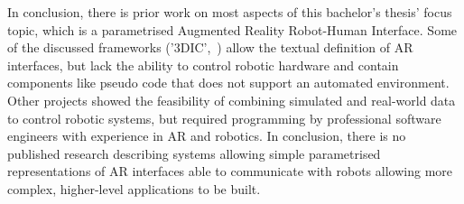 In conclusion, there is prior work on most aspects of this bachelor’s thesis’ focus topic, which is a parametrised Augmented Reality Robot-Human Interface. Some of the discussed frameworks ('3DIC',~\cite{figueroa2006conceptual}) allow the textual definition of AR interfaces, but lack the ability to control robotic hardware and contain components like pseudo code that does not support an automated environment. Other projects showed the feasibility of combining simulated and real-world data to control robotic systems, but required programming by professional software engineers with experience in AR and robotics. In conclusion, there is no published research describing systems allowing simple parametrised representations of AR interfaces able to communicate with robots allowing more complex, higher-level applications to be built.












